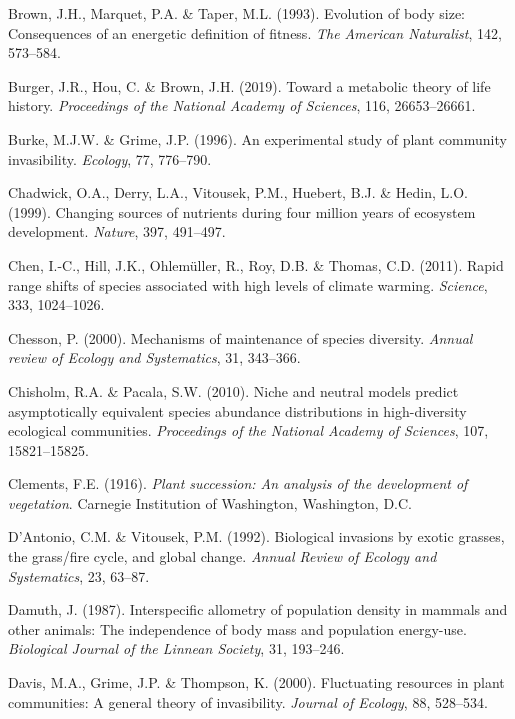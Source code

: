 \documentclass[
  letterpaper,
  DIV=11,
  numbers=noendperiod]{scrartcl}
\newlength{\cslhangindent}
\newenvironment{CSLReferences}[2] %
 {\begin{list}{}{%
  \setlength{\itemindent}{0pt}
  \setlength{\leftmargin}{0pt}
  \setlength{\parsep}{0pt}
  \ifodd #1
   \setlength{\leftmargin}{\cslhangindent}
   \setlength{\itemindent}{-1\cslhangindent}
  \fi
  \setlength{\itemsep}{#2\baselineskip}}}
 {\end{list}}
\begin{document}
\begin{CSLReferences}{1}{0}
Brown, J.H., Marquet, P.A. \& Taper, M.L. (1993). Evolution of body
size: Consequences of an energetic definition of fitness. \emph{The
American Naturalist}, 142, 573--584.

Burger, J.R., Hou, C. \& Brown, J.H. (2019). Toward a metabolic theory
of life history. \emph{Proceedings of the National Academy of Sciences},
116, 26653--26661.

Burke, M.J.W. \& Grime, J.P. (1996). An experimental study of plant
community invasibility. \emph{Ecology}, 77, 776--790.

Chadwick, O.A., Derry, L.A., Vitousek, P.M., Huebert, B.J. \& Hedin,
L.O. (1999). Changing sources of nutrients during four million years of
ecosystem development. \emph{Nature}, 397, 491--497.

Chen, I.-C., Hill, J.K., Ohlemüller, R., Roy, D.B. \& Thomas, C.D.
(2011). Rapid range shifts of species associated with high levels of
climate warming. \emph{Science}, 333, 1024--1026.

Chesson, P. (2000). Mechanisms of maintenance of species diversity.
\emph{Annual review of Ecology and Systematics}, 31, 343--366.

Chisholm, R.A. \& Pacala, S.W. (2010). Niche and neutral models predict
asymptotically equivalent species abundance distributions in
high-diversity ecological communities. \emph{Proceedings of the National
Academy of Sciences}, 107, 15821--15825.

Clements, F.E. (1916). \emph{Plant succession: An analysis of the
development of vegetation}. Carnegie Institution of Washington,
Washington, D.C.

D'Antonio, C.M. \& Vitousek, P.M. (1992). Biological invasions by exotic
grasses, the grass/fire cycle, and global change. \emph{Annual Review of
Ecology and Systematics}, 23, 63--87.

Damuth, J. (1987). Interspecific allometry of population density in
mammals and other animals: The independence of body mass and population
energy-use. \emph{Biological Journal of the Linnean Society}, 31,
193--246.

Davis, M.A., Grime, J.P. \& Thompson, K. (2000). Fluctuating resources
in plant communities: A general theory of invasibility. \emph{Journal of
Ecology}, 88, 528--534.


\end{CSLReferences}
\end{document}
